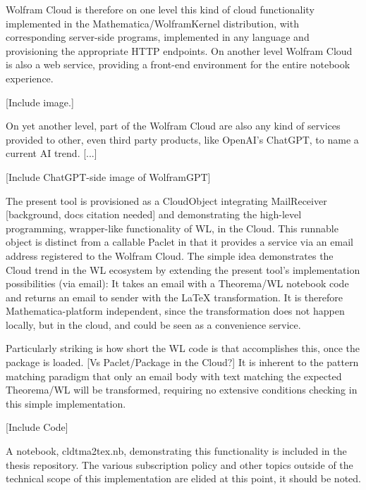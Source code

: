 Wolfram Cloud is therefore on one level this kind of cloud functionality implemented in the Mathematica/WolframKernel distribution, with corresponding server-side programs, implemented in any language and provisioning the appropriate HTTP endpoints. On another level Wolfram Cloud is also a web service, providing a front-end environment for the entire notebook experience.

[Include image.]

On yet another level, part of the Wolfram Cloud are also any kind of services provided to other, even third party products, like OpenAI's ChatGPT, to name a current AI trend. [...]

[Include ChatGPT-side image of WolframGPT]

The present tool is provisioned as a CloudObject integrating MailReceiver [background, docs citation needed] and demonstrating the high-level programming, wrapper-like functionality of WL, in the Cloud. This runnable object is distinct from a callable Paclet in that it provides a service via an email address registered to the Wolfram Cloud. The simple idea demonstrates the Cloud trend in the WL ecosystem by extending the present tool's implementation possibilities (via email): It takes an email with a Theorema/WL notebook code and returns an email to sender with the LaTeX transformation. It is therefore Mathematica-platform independent, since the transformation does not happen locally, but in the cloud, and could be seen as a convenience service.

Particularly striking is how short the WL code is that accomplishes this, once the package is loaded. [Vs Paclet/Package in the Cloud?] It is inherent to the pattern matching paradigm that only an email body with text matching the expected Theorema/WL will be transformed, requiring no extensive conditions checking in this simple implementation.

[Include Code]

A notebook, cldtma2tex.nb, demonstrating this functionality is included in the thesis repository. The various subscription policy and other topics outside of the technical scope of this implementation are elided at this point, it should be noted.